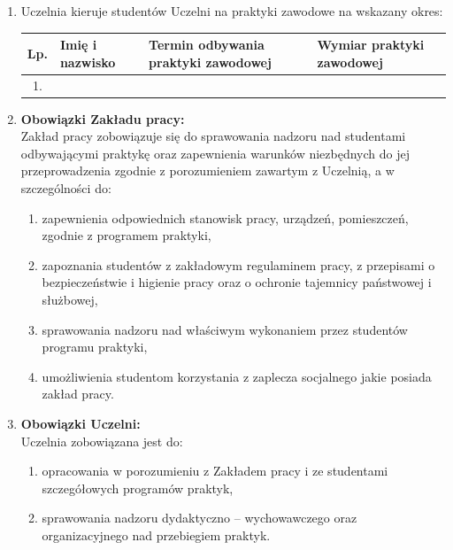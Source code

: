 \documentclass[11pt,a4paper]{article}
\begin{document}
\begin{enumerate}[label=\arabic*., leftmargin=*, itemsep=2pt, parsep=0pt]
    \item Uczelnia kieruje studentów Uczelni na praktyki zawodowe na wskazany okres:

    \vspace{0.5em}
    \begin{center}
    \renewcommand{\arraystretch}{1.3} %
    \begin{tabular}{|c|p{4cm}|p{5cm}|p{3cm}|}
    \hline
    Lp. & Imię i nazwisko & Termin odbywania praktyki zawodowej & Wymiar praktyki zawodowej \\ \hline
    1. & & & \\ \hline
    \end{tabular}
    \end{center}
    \vspace{0.5em}

    \item \textbf{Obowiązki Zakładu pracy:} \\
    Zakład pracy zobowiązuje się do sprawowania nadzoru nad studentami odbywającymi praktykę oraz zapewnienia warunków niezbędnych do jej przeprowadzenia zgodnie z porozumieniem zawartym z Uczelnią, a w szczególności do:
    \begin{enumerate}[label=\arabic*), itemsep=0pt, parsep=0pt]
        \item zapewnienia odpowiednich stanowisk pracy, urządzeń, pomieszczeń, zgodnie z programem praktyki,
        \item zapoznania studentów z zakładowym regulaminem pracy, z przepisami o bezpieczeństwie i higienie pracy oraz o ochronie tajemnicy państwowej i służbowej,
        \item sprawowania nadzoru nad właściwym wykonaniem przez studentów programu praktyki,
        \item umożliwienia studentom korzystania z zaplecza socjalnego jakie posiada zakład pracy.
    \end{enumerate}

    \item \textbf{Obowiązki Uczelni:} \\
    Uczelnia zobowiązana jest do:
    \begin{enumerate}[label=\arabic*), itemsep=0pt, parsep=0pt]
        \item opracowania w porozumieniu z Zakładem pracy i ze studentami szczegółowych programów praktyk,
        \item sprawowania nadzoru dydaktyczno – wychowawczego oraz organizacyjnego nad przebiegiem praktyk.
    \end{enumerate}


\end{enumerate}
\end{document}
